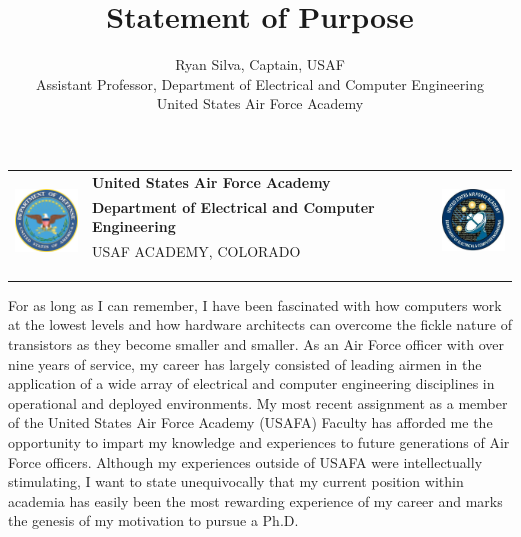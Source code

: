 \documentclass{article}
\begin{document}
\noindent \begin{tabu} to \textwidth{l X[c] r}
 & 
\textbf{United States Air Force Academy} &  
\\
& \textbf{Department of Electrical and Computer Engineering} & \\
& \tiny{USAF ACADEMY, COLORADO}\\
\\ \\ \\
\end{tabu}

\title{Statement of Purpose}
\author{Ryan Silva, Captain, USAF\\Assistant Professor, Department of
Electrical and Computer Engineering\\United States Air Force Academy}
\date{}
{\let\newpage\relax\maketitle}

For as long as I can remember, I have been fascinated with how computers work
at the lowest levels and how hardware architects can overcome the
fickle nature of transistors as they become smaller and smaller. 
As an Air Force officer with over nine years of service, my career has largely consisted of
leading airmen in the application of a wide array of electrical and computer
engineering disciplines in operational and deployed environments. My most
recent assignment as a member of the United States Air Force 
Academy (USAFA) Faculty has afforded me the opportunity to impart my knowledge and
experiences to future generations of Air Force officers. Although my
experiences outside of USAFA were
intellectually stimulating, I want to state
unequivocally that my current position within academia has easily been the most
rewarding experience of my career and marks the genesis of my motivation to pursue
a Ph.D. 
\end{document}
